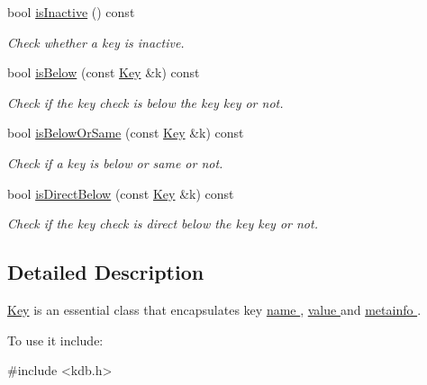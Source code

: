 \begin{DoxyCompactItemize}
bool \hyperlink{classkdb_1_1Key_adcd75cc13e9d766eaac72beb7d748bdb}{is\+Inactive} () const 
\begin{DoxyCompactList}\small\item\em Check whether a key is inactive. \end{DoxyCompactList}\item 
bool \hyperlink{classkdb_1_1Key_a493893308d5b4c54d646cc0df5a076ae}{is\+Below} (const \hyperlink{classkdb_1_1Key}{Key} \&k) const 
\begin{DoxyCompactList}\small\item\em Check if the key check is below the key key or not. \end{DoxyCompactList}\item 
bool \hyperlink{classkdb_1_1Key_a0d4d2d50f9e3624ade560b0f74267d86}{is\+Below\+Or\+Same} (const \hyperlink{classkdb_1_1Key}{Key} \&k) const 
\begin{DoxyCompactList}\small\item\em Check if a key is below or same or not. \end{DoxyCompactList}\item 
bool \hyperlink{classkdb_1_1Key_a3cc66b309bd42e67d7bc0e4234aa76a1}{is\+Direct\+Below} (const \hyperlink{classkdb_1_1Key}{Key} \&k) const 
\begin{DoxyCompactList}\small\item\em Check if the key check is direct below the key key or not. \end{DoxyCompactList}\end{DoxyCompactItemize}


\subsection{Detailed Description}
\hyperlink{classkdb_1_1Key}{Key} is an essential class that encapsulates key \hyperlink{group__keyname}{name }, \hyperlink{group__keyvalue}{value } and \hyperlink{group__keymeta}{metainfo }. 

To use it include\+: 
\begin{DoxyCode}
\textcolor{preprocessor}{#include <kdb.h>}
\end{DoxyCode}


